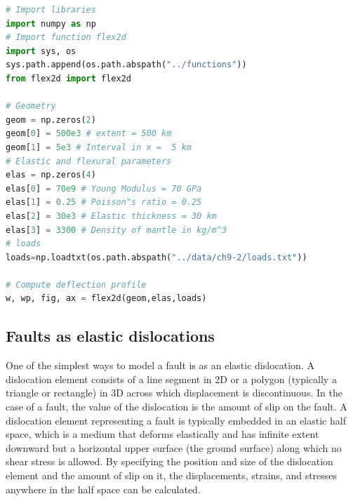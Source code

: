 \documentclass[a4paper , 12pt]{book}
\begin{document}
\begin{center}
\begin{lstlisting}[language=Python, frame=single]
# Import libraries
import numpy as np
# Import function flex2d
import sys, os
sys.path.append(os.path.abspath("../functions"))
from flex2d import flex2d

# Geometry
geom = np.zeros(2)
geom[0] = 500e3 # extent = 500 km
geom[1] = 5e3 # Interval in x =  5 km
# Elastic and flexural parameters
elas = np.zeros(4)
elas[0] = 70e9 # Young Modulus = 70 GPa
elas[1] = 0.25 # Poisson"s ratio = 0.25
elas[2] = 30e3 # Elastic thickness = 30 km
elas[3] = 3300 # Density of mantle in kg/m^3
# loads
loads=np.loadtxt(os.path.abspath("../data/ch9-2/loads.txt"))

# Compute deflection profile
w, wp, fig, ax = flex2d(geom,elas,loads)
\end{lstlisting}
\end{center}

\subsection{Faults as elastic dislocations}\label{ElasDisloc}

One of the simplest ways to model a fault is as an elastic dislocation. A dislocation element consists of a line segment in 2D or a polygon (typically a triangle or rectangle) in 3D across which displacement is discontinuous. In the case of a fault, the value of the dislocation is the amount of slip on the fault. A dislocation element representing a fault is typically embedded in an elastic half space, which is a medium that deforms elastically and has infinite extent downward but a horizontal upper surface (the ground surface) along which no shear stress is allowed. By specifying the position and size of the dislocation element and the amount of slip on it, the displacements, strains, and stresses anywhere in the half space can be calculated.
\end{document}
